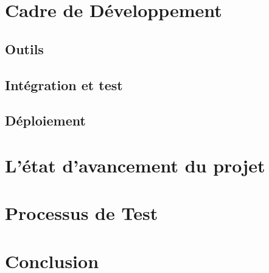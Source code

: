 \section{Cadre de Développement}

\subsection{Outils}

\subsection{Intégration et test}

\subsection{Déploiement}

\section{L'état d'avancement du projet}

\section{Processus de Test}

\section{Conclusion}